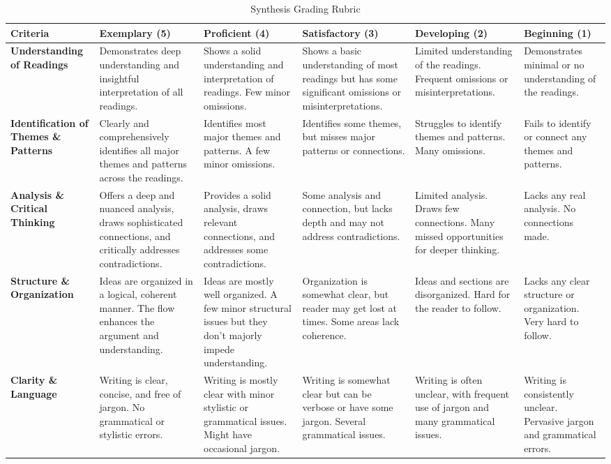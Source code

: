 \documentclass[12pt, letterpaper]{article}
\begin{document}
\begin{table}[h!]
\tiny
\centering
\caption{Synthesis Grading Rubric}
\begin{tabularx}{\textwidth}{|X|X|X|X|X|X|}
\toprule
\textbf{Criteria} & \textbf{Exemplary (5)} & \textbf{Proficient (4)} & \textbf{Satisfactory (3)} & \textbf{Developing (2)} & \textbf{Beginning (1)} \\
\midrule
\textbf{Understanding of Readings} & Demonstrates deep understanding and insightful interpretation of all readings. & Shows a solid understanding and interpretation of readings. Few minor omissions. & Shows a basic understanding of most readings but has some significant omissions or misinterpretations. & Limited understanding of the readings. Frequent omissions or misinterpretations. & Demonstrates minimal or no understanding of the readings. \\
\midrule
\textbf{Identification of Themes \& Patterns} & Clearly and comprehensively identifies all major themes and patterns across the readings. & Identifies most major themes and patterns. A few minor omissions. & Identifies some themes, but misses major patterns or connections. & Struggles to identify themes and patterns. Many omissions. & Fails to identify or connect any themes and patterns. \\
\midrule
\textbf{Analysis \& Critical Thinking} & Offers a deep and nuanced analysis, draws sophisticated connections, and critically addresses contradictions. & Provides a solid analysis, draws relevant connections, and addresses some contradictions. & Some analysis and connection, but lacks depth and may not address contradictions. & Limited analysis. Draws few connections. Many missed opportunities for deeper thinking. & Lacks any real analysis. No connections made. \\
\midrule
\textbf{Structure \& Organization} & Ideas are organized in a logical, coherent manner. The flow enhances the argument and understanding. & Ideas are mostly well organized. A few minor structural issues but they don't majorly impede understanding. & Organization is somewhat clear, but reader may get lost at times. Some areas lack coherence. & Ideas and sections are disorganized. Hard for the reader to follow. & Lacks any clear structure or organization. Very hard to follow. \\
\midrule
\textbf{Clarity \& Language} & Writing is clear, concise, and free of jargon. No grammatical or stylistic errors. & Writing is mostly clear with minor stylistic or grammatical issues. Might have occasional jargon. & Writing is somewhat clear but can be verbose or have some jargon. Several grammatical issues. & Writing is often unclear, with frequent use of jargon and many grammatical issues. & Writing is consistently unclear. Pervasive jargon and grammatical errors. \\
\bottomrule
\end{tabularx}
\label{tab:synthesis-rubric}
\end{table}
\end{document}
